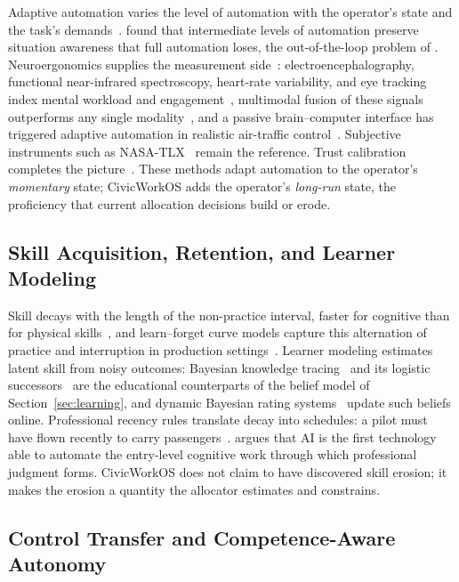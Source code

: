 \documentclass[utf8]{FrontiersinHarvard}
\begin{document}
	Adaptive automation varies the level of automation with the operator's state and the task's demands~\citep{Parasuraman2000,KaberEndsley2004}. \citet{KaberEndsley2004} found that intermediate levels of automation preserve situation awareness that full automation loses, the out-of-the-loop problem of \citet{EndsleyKiris1995}. Neuroergonomics supplies the measurement side~\citep{Parasuraman2003}: electroencephalography, functional near-infrared spectroscopy, heart-rate variability, and eye tracking index mental workload and engagement~\citep{Dehais2020}, multimodal fusion of these signals outperforms any single modality~\citep{Debie2021}, and a passive brain--computer interface has triggered adaptive automation in realistic air-traffic control~\citep{Arico2016}. Subjective instruments such as NASA-TLX~\citep{HartStaveland1988} remain the reference. Trust calibration completes the picture~\citep{LeeSee2004,Wischnewski2023}. These methods adapt automation to the operator's \textit{momentary} state; CivicWorkOS adds the operator's \textit{long-run} state, the proficiency that current allocation decisions build or erode.

	\subsection{Skill Acquisition, Retention, and Learner Modeling}
	\label{sec:rw-skill}

	Skill decays with the length of the non-practice interval, faster for cognitive than for physical skills~\citep{Arthur1998,TatelAckerman2025}, and learn--forget curve models capture this alternation of practice and interruption in production settings~\citep{JaberBonney1996}. Learner modeling estimates latent skill from noisy outcomes: Bayesian knowledge tracing~\citep{Corbett1994} and its logistic successors~\citep{Pelanek2017} are the educational counterparts of the belief model of Section~\ref{sec:learning}, and dynamic Bayesian rating systems~\citep{Glickman1999} update such beliefs online. Professional recency rules translate decay into schedules: a pilot must have flown recently to carry passengers~\citep{FAA6157}. \citet{Rashidi2026} argues that AI is the first technology able to automate the entry-level cognitive work through which professional judgment forms. CivicWorkOS does not claim to have discovered skill erosion; it makes the erosion a quantity the allocator estimates and constrains.

	\subsection{Control Transfer and Competence-Aware Autonomy}
	\label{sec:rw-takeover}
\end{document}
